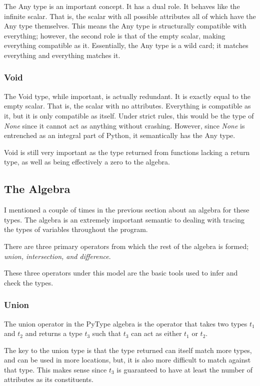 \documentclass{scrartcl}
\begin{document}
\begin{multicols}{2}
The Any type is an important concept. It has a dual role.  It behaves like the
infinite scalar. That is, the scalar with all possible attributes all of which
have the Any type themselves. This means the Any type is structurally compatible
with everything; however, the second role is that of the empty scalar, making
everything compatible as it. Essentially, the Any type is a wild card; it matches
everything and everything matches it.

\subsubsection*{Void}

The Void type, while important, is actually redundant. It is exactly equal to the
empty scalar. That is, the scalar with no attributes. Everything is compatible
as it, but it is only compatible as itself. Under strict rules, this would be the
type of \emph{None} since it cannot act as anything without crashing. However,
since \emph{None} is entrenched as an integral part of Python, it semantically
has the Any type.

Void is still very important as the type returned from functions lacking a return
type, as well as being effectively a zero to the algebra.


\subsection*{The Algebra}

I mentioned a couple of times in the previous section about an algebra for these types.
The algebra is an extremely important semantic to dealing with tracing the
types of variables throughout the program.

There are three primary operators from which the rest of the algebra is formed;
\emph{union, intersection, and difference}.

These three operators under this model are the basic tools used to infer and check
the types.

\subsubsection*{Union}

The union operator in the PyType algebra is the operator that takes
two types $t_1$ and $t_2$ and returns a type $t_3$ such that $t_3$ can
act as either $t_1$ or $t_2$.

The key to the union type is that the type returned can itself match more
types, and can be used in more locations, but, it is also more difficult
to match against that type. This makes sense since $t_3$ is guaranteed
to have at least the number of attributes as its constituents.


\end{multicols}
\end{document}
